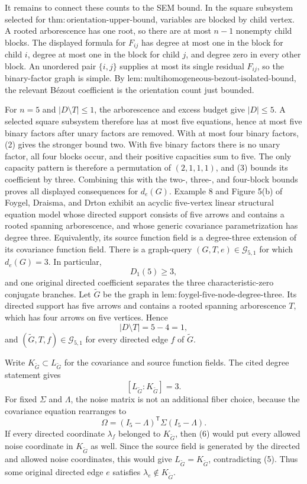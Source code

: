 It remains to connect these counts to the SEM bound. In the square subsystem selected for \(\mathrm{thm:orientation\mbox{-}upper\mbox{-}bound}\), variables are blocked by child vertex. A rooted arborescence has one root, so there are at most \(n-1\) nonempty child blocks. The displayed formula for \(F_{ij}\) has degree at most one in the block for child \(i\), degree at most one in the block for child \(j\), and degree zero in every other block. An unordered pair \(\{i,j\}\) supplies at most its single residual \(F_{ij}\), so the binary-factor graph is simple. By \(\mathrm{lem:multihomogeneous\mbox{-}bezout\mbox{-}isolated\mbox{-}bound}\), the relevant B\'ezout coefficient is the orientation count just bounded.

For \(n=5\) and \(|D\setminus T|\leq1\), the arborescence and excess budget give \(|D|\leq5\). A selected square subsystem therefore has at most five equations, hence at most five binary factors after unary factors are removed. With at most four binary factors, (2) gives the stronger bound two. With five binary factors there is no unary factor, all four blocks occur, and their positive capacities sum to five. The only capacity pattern is therefore a permutation of \((2,1,1,1)\), and (3) bounds its coefficient by three. Combining this with the two-, three-, and four-block bounds proves all displayed consequences for \(d_e(G)\).
Example 8 and Figure 5(b) of Foygel, Draisma, and Drton exhibit an acyclic five-vertex linear structural equation model whose directed support consists of five arrows and contains a rooted spanning arborescence, and whose generic covariance parametrization has degree three. Equivalently, its source function field is a degree-three extension of its covariance function field.
There is a graph-query \((G,T,e)\in\mathcal G_{5,1}\) for which \(d_e(G)=3\). In particular,
\[
 D_1(5)\geq3,
\]
and one original directed coefficient separates the three characteristic-zero conjugate branches.
Let \(\widetilde G\) be the graph in \(\mathrm{lem:foygel\mbox{-}five\mbox{-}node\mbox{-}degree\mbox{-}three}\). Its directed support has five arrows and contains a rooted spanning arborescence \(T\), which has four arrows on five vertices. Hence
\[
 |D\setminus T|=5-4=1,
\]
and \((\widetilde G,T,f)\in\mathcal G_{5,1}\) for every directed edge \(f\) of \(\widetilde G\).

Write \(K_{\widetilde G}\subset L_{\widetilde G}\) for the covariance and source function fields. The cited degree statement gives
\[
 [L_{\widetilde G}:K_{\widetilde G}]=3.
 \tag{5}
\]
For fixed \(\Sigma\) and \(\Lambda\), the noise matrix is not an additional fiber choice, because the covariance equation rearranges to
\[
 \Omega=(I_5-\Lambda)^{\mathsf T}\Sigma(I_5-\Lambda).
 \tag{6}
\]
If every directed coordinate \(\lambda_f\) belonged to \(K_{\widetilde G}\), then (6) would put every allowed noise coordinate in \(K_{\widetilde G}\) as well. Since the source field is generated by the directed and allowed noise coordinates, this would give \(L_{\widetilde G}=K_{\widetilde G}\), contradicting (5). Thus some original directed edge \(e\) satisfies \(\lambda_e\notin K_{\widetilde G}\).

